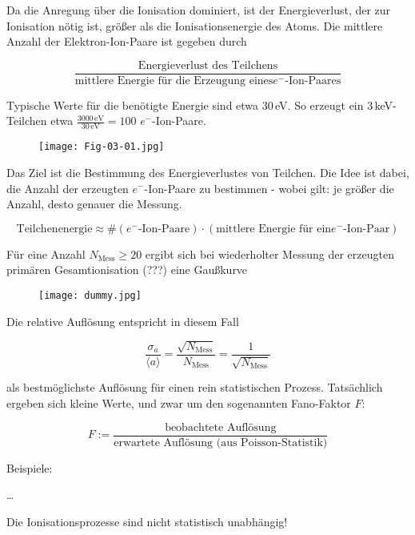 Da die Anregung über die Ionisation dominiert, ist der Energieverlust, der zur Ionisation nötig ist,
größer als die Ionisationsenergie des Atoms. Die mittlere Anzahl der Elektron-Ion-Paare ist gegeben
durch

\[\frac{\text{Energieverlust des Teilchens}}{\text{mittlere Energie für die Erzeugung eines
$e^-$-Ion-Paares}} \]

Typische Werte für die benötigte Energie sind etwa $30\,$eV. So erzeugt ein $3\,$keV-Teilchen etwa
$\frac{3000\,\text{eV}}{30\,\text{eV}}=100$ $e^-$-Ion-Paare.

\begin{figure}[H]
	\centering
	\texttt{[image: Fig-03-01.jpg]}
\end{figure}

Das Ziel ist die Bestimmung des Energieverlustes von Teilchen. Die Idee ist dabei, die Anzahl der
erzeugten $e^-$-Ion-Paare zu bestimmen - wobei gilt: je größer die Anzahl, desto genauer die
Messung.

\[\text{Teilchenenergie}\approx \#(\text{$e^-$-Ion-Paare})\cdot (\text{mittlere Energie für ein
$e^-$-Ion-Paar})\]

Für eine Anzahl $N_{\text{Mess}}\ge 20$ ergibt sich bei wiederholter Messung der erzeugten primären
Gesamtionisation (???) eine Gaußkurve

\begin{figure}[H]
	\centering
	\texttt{[image: dummy.jpg]}
\end{figure}

Die relative Auflösung entspricht in diesem Fall

\[\frac{\sigma_{a}}{\langle a \rangle} =
\frac{\sqrt{N_{\text{Mess}}}}{N_{\text{Mess}}}=\frac{1}{\sqrt{N_{\text{Mess}}}}
\]

als bestmöglichste Auflösung für einen rein statistischen Prozess. Tatsächlich ergeben sich kleine
Werte, und zwar um den sogenannten Fano-Faktor $F$:

\[ F:=\frac{\text{beobachtete Auflösung}}{\text{erwartete Auflösung (aus Poisson-Statistik)}} \]

Beispiele:

\ldots

Die Ionisationsprozesse sind nicht statistisch unabhängig!

